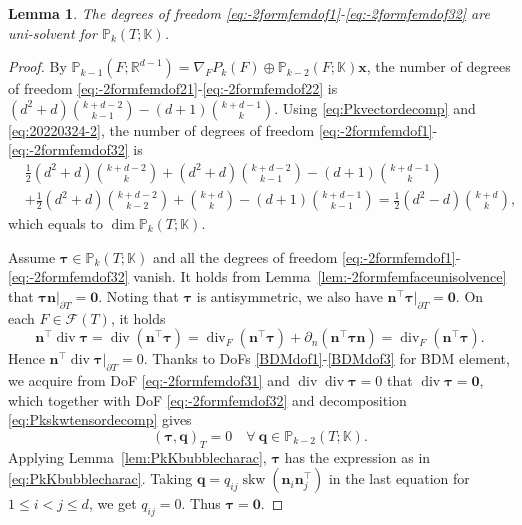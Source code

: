 \documentclass[10pt]{amsart}
\newtheorem{lemma}[theorem]{Lemma}
\renewcommand{\div}{\operatorname{div}}
\newcommand{\skw}{\operatorname{skw}}
\numberwithin{equation}{section}
\begin{document}
\begin{lemma}
The degrees of freedom \eqref{eq:-2formfemdof1}-\eqref{eq:-2formfemdof32} are uni-solvent for $\mathbb P_k(T;\mathbb K)$.
\end{lemma}
\begin{proof}
By $\mathbb P_{k-1}(F;\mathbb R^{d-1})=\nabla_FP_k(F)\oplus\mathbb P_{k-2}(F;\mathbb K)\boldsymbol{x}$,
the number of degrees of freedom \eqref{eq:-2formfemdof21}-\eqref{eq:-2formfemdof22} is
$
(d^2+d){k+d-2\choose k-1} - (d+1){k+d-1\choose k}.
$
Using \eqref{eq:Pkvectordecomp} and \eqref{eq:20220324-2},
the number of degrees of freedom \eqref{eq:-2formfemdof1}-\eqref{eq:-2formfemdof32} is
\begin{align*}
&\frac{1}{2}(d^2+d){k+d-2\choose k} + (d^2+d){k+d-2\choose k-1} - (d+1){k+d-1\choose k} \\
&+ \frac{1}{2}(d^2+d){k+d-2\choose k-2}+{k+d\choose k}-(d+1){k+d-1\choose k-1} =\frac{1}{2}(d^2-d){k+d\choose k},
\end{align*}
which equals to $\dim\mathbb P_k(T;\mathbb K)$.

Assume $\boldsymbol{\tau}\in\mathbb P_k(T;\mathbb K)$ and all the degrees of freedom \eqref{eq:-2formfemdof1}-\eqref{eq:-2formfemdof32} vanish. 
It holds from Lemma~\ref{lem:-2formfemfaceunisolvence} that $\boldsymbol{\tau}\boldsymbol{n}|_{\partial T}=\boldsymbol{0}$. Noting that $\boldsymbol{\tau}$ is antisymmetric,  we also have $\boldsymbol{n}^{\intercal}\boldsymbol{\tau}|_{\partial T}=\boldsymbol{0}$. On each $F\in\mathcal F(T)$, it holds
\begin{equation}\label{eq:20220324-3}
\boldsymbol{n}^{\intercal}\div\boldsymbol{\tau}=\div(\boldsymbol{n}^{\intercal}\boldsymbol{\tau})= \div_F(\boldsymbol{n}^{\intercal}\boldsymbol{\tau})+\partial_n(\boldsymbol{n}^{\intercal}\boldsymbol{\tau}\boldsymbol{n})=\div_F(\boldsymbol{n}^{\intercal}\boldsymbol{\tau}).
\end{equation}
Hence $\boldsymbol{n}^{\intercal}\div\boldsymbol{\tau}|_{\partial T}=0$. 
Thanks to DoFs \eqref{BDMdof1}-\eqref{BDMdof3} for BDM element, we acquire from DoF \eqref{eq:-2formfemdof31} and $\div\div\boldsymbol{\tau}=0$ that $\div\boldsymbol{\tau}=\boldsymbol{0}$, which together with DoF \eqref{eq:-2formfemdof32} and decomposition \eqref{eq:Pkskwtensordecomp} gives
\[
(\boldsymbol{\tau}, \boldsymbol{q})_T=0  \quad \forall~\boldsymbol{q}\in \mathbb P_{k-2}(T;\mathbb K).
\]
Applying Lemma~\ref{lem:PkKbubblecharac}, $\boldsymbol{\tau}$ has the expression as in \eqref{eq:PkKbubblecharac}. Taking $\boldsymbol{q}=q_{ij}\skw({\boldsymbol n_i\boldsymbol n_j^{\intercal}})$ in the last equation for $1\leq i<j\leq d$, we get $q_{ij}=0$. Thus $\boldsymbol{\tau}=\boldsymbol{0}$.
\end{proof}
\end{document}
